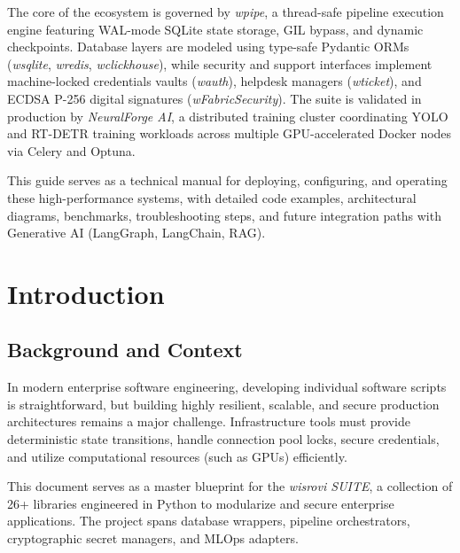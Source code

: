 \documentclass[12pt,a4paper]{report}
\begin{document}
The core of the ecosystem is governed by \textit{wpipe}, a thread-safe pipeline execution engine featuring WAL-mode SQLite state storage, GIL bypass, and dynamic checkpoints. Database layers are modeled using type-safe Pydantic ORMs (\textit{wsqlite}, \textit{wredis}, \textit{wclickhouse}), while security and support interfaces implement machine-locked credentials vaults (\textit{wauth}), helpdesk managers (\textit{wticket}), and ECDSA P-256 digital signatures (\textit{wFabricSecurity}). The suite is validated in production by \textit{NeuralForge AI}, a distributed training cluster coordinating YOLO and RT-DETR training workloads across multiple GPU-accelerated Docker nodes via Celery and Optuna. 

This guide serves as a technical manual for deploying, configuring, and operating these high-performance systems, with detailed code examples, architectural diagrams, benchmarks, troubleshooting steps, and future integration paths with Generative AI (LangGraph, LangChain, RAG).

\cleardoublepage
\chapter{Introduction}

\section{\sffamily Background and Context}
In modern enterprise software engineering, developing individual software scripts is straightforward, but building highly resilient, scalable, and secure production architectures remains a major challenge. Infrastructure tools must provide deterministic state transitions, handle connection pool locks, secure credentials, and utilize computational resources (such as GPUs) efficiently. 

This document serves as a master blueprint for the \textit{wisrovi SUITE}, a collection of 26+ libraries engineered in Python to modularize and secure enterprise applications. The project spans database wrappers, pipeline orchestrators, cryptographic secret managers, and MLOps adapters.
\end{document}
